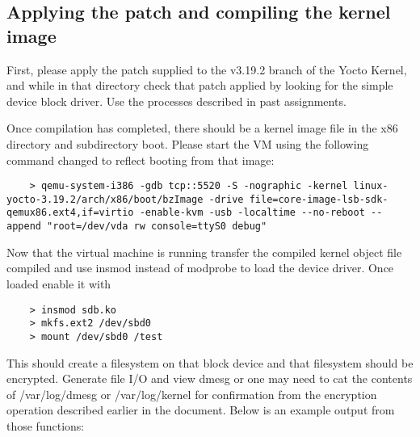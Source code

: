 \documentclass[onecolumn, draftclsnofoot,10pt, compsoc]{IEEEtran}
\begin{document}
\begin{enumerate}
    \subsection*{Applying the patch and compiling the kernel image}
    \begin{singlespace}
    First, please apply the patch supplied to the v3.19.2 branch of the Yocto Kernel, and while in that directory check that patch applied by looking for the simple device block driver. Use the processes described in past assignments.

    Once compilation has completed, there should be a kernel image file in the x86 directory and subdirectory boot. Please start the VM using the following command changed to reflect booting from that image:
    \end{singlespace}
    \begin{lstlisting}
    > qemu-system-i386 -gdb tcp::5520 -S -nographic -kernel linux-yocto-3.19.2/arch/x86/boot/bzImage -drive file=core-image-lsb-sdk-qemux86.ext4,if=virtio -enable-kvm -usb -localtime --no-reboot --append "root=/dev/vda rw console=ttyS0 debug"
    \end{lstlisting}
    \begin{singlespace}
    Now that the virtual machine is running transfer the compiled kernel object file  compiled and use insmod instead of modprobe to load the device driver. Once loaded enable it with
    \end{singlespace}
    \begin{lstlisting}
    > insmod sdb.ko
    > mkfs.ext2 /dev/sbd0
    > mount /dev/sbd0 /test
    \end{lstlisting}
    This should create a filesystem on that block device and that filesystem should be encrypted. Generate file I/O and view dmesg or one may need to cat the contents of /var/log/dmesg or /var/log/kernel for confirmation from the encryption operation described earlier in the document. Below is an example output from those functions:
    

\end{enumerate}
\end{document}
